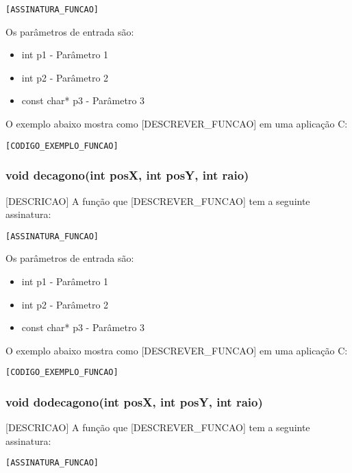 \documentclass[12pt, %
openright,
oneside, %
a4paper,    %
brazil]{facom-ufu-abntex2}
\begin{document}
\begin{lstlisting}
[ASSINATURA_FUNCAO]
\end{lstlisting}

Os parâmetros de entrada são:

\begin{itemize}
    \item int p1 - Parâmetro 1
    \item int p2 - Parâmetro 2
    \item const char* p3 - Parâmetro 3
\end{itemize}

O exemplo abaixo mostra como [DESCREVER_FUNCAO] em uma aplicação C:

\begin{lstlisting}
[CODIGO_EXEMPLO_FUNCAO]
\end{lstlisting}

\subsubsection{void decagono(int posX, int posY, int raio)}
[DESCRICAO]
A função que [DESCREVER_FUNCAO] tem a seguinte assinatura:

\begin{lstlisting}
[ASSINATURA_FUNCAO]
\end{lstlisting}

Os parâmetros de entrada são:

\begin{itemize}
    \item int p1 - Parâmetro 1
    \item int p2 - Parâmetro 2
    \item const char* p3 - Parâmetro 3
\end{itemize}

O exemplo abaixo mostra como [DESCREVER_FUNCAO] em uma aplicação C:

\begin{lstlisting}
[CODIGO_EXEMPLO_FUNCAO]
\end{lstlisting}

\subsubsection{void dodecagono(int posX, int posY, int raio)}
[DESCRICAO]
A função que [DESCREVER_FUNCAO] tem a seguinte assinatura:

\begin{lstlisting}
[ASSINATURA_FUNCAO]
\end{lstlisting}
\end{document}
